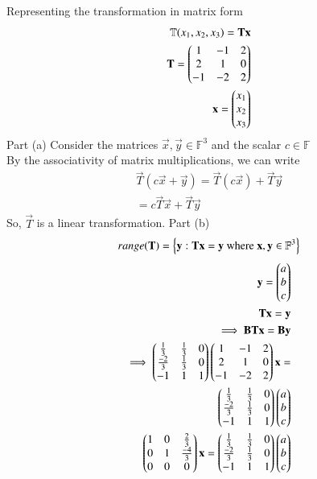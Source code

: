 Representing the transformation in matrix form
\begin{align}
 \mathbb{T}(x_1,x_2,x_3)=\mathbf{T}\mathbf{x}\\
    \mathbf{T}=\begin{pmatrix}1&-1&2\\2&1&0\\-1&-2&2\end{pmatrix}\\
    \mathbf{x}=\begin{pmatrix}x_1\\x_2\\x_3\end{pmatrix}
\end{align}
{Part (a)}
Consider the matrices $\vec{x},\vec{y} \in \mathbb{F}^3$ and the scalar $c \in \mathbb{F}$\\
By the associativity of matrix multiplications, we can write
\begin{align}
    \vec{T}(c\vec{x}+\vec{y})=\vec{T}(c\vec{x})+\vec{T}\vec{y}\\
    =c\vec{T}\vec{x}+\vec{T}\vec{y}
\end{align}
So, $\vec{T}$ is a linear transformation.
{Part (b)}
\begin{align}
range(\mathbf{T})
=\left\{\mathbf{y}:\mathbf{T}\mathbf{x}=\mathbf{y} \text{ where }\mathbf{x},\mathbf{y} \in \mathbb{F}^3\right\}
\end{align}
\begin{align}
    \mathbf{y}=\begin{pmatrix}a\\b\\c\end{pmatrix}\\
    \mathbf{T}\mathbf{x}=\mathbf{y}\\
    \implies \mathbf{B}\mathbf{T}\mathbf{x}=\mathbf{B}\mathbf{y}\\
    \implies \begin{pmatrix}\frac{1}{3}&\frac{1}{3}&0\\\frac{-2}{3}&\frac{1}{3}&0\\-1&1&1\end{pmatrix}\begin{pmatrix}1&-1&2\\2&1&0\\-1&-2&2\end{pmatrix}\mathbf{x}=\\ \begin{pmatrix}\frac{1}{3}&\frac{1}{3}&0\\\frac{-2}{3}&\frac{1}{3}&0\\-1&1&1\end{pmatrix}\begin{pmatrix}a\\b\\c\end{pmatrix}\\
    \begin{pmatrix}1&0&\frac{2}{3}\\0&1&\frac{-4}{3}\\0&0&0\end{pmatrix}\mathbf{x}=\begin{pmatrix}\frac{1}{3}&\frac{1}{3}&0\\\frac{-2}{3}&\frac{1}{3}&0\\-1&1&1\end{pmatrix}\begin{pmatrix}a\\b\\c\end{pmatrix}\label{eq:solutions/3/1/7/4}
\end{align}
